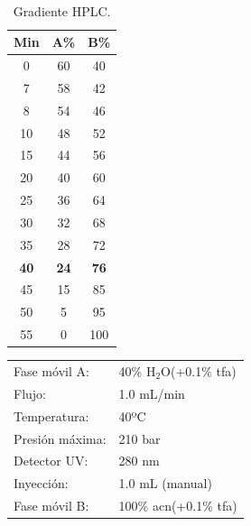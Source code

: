 \begin{table}
\vspace{-0.8cm} %
\centering
    \caption{\\Gradiente HPLC.}\label{tab:hplc_gradiente}
    \begin{tabular}[t]{ccc}%
     \toprule  %
      {Min}  & {A\%} & {B\%}\\
      \hline
        0       &  60    & 40  \\
        7       &  58    & 42 \\
        8       &  54    & 46  \\
        10      &  48    & 52 \\
        15      &  44    & 56  \\
        20      &  40    & 60 \\
        25      &  36    & 64  \\
        30      &  32    & 68 \\
        35      &  28    & 72  \\
    \textbf{40} & \textbf{24}    & \textbf{76} \\
        45      &  15    & 85  \\
        50      &  5     & 95 \\
        55      &  0     & 100  \\
      \bottomrule %
    \end{tabular}
    \vspace{-0.5cm} %
    \end{table} 

\begin{tabularx}{\textwidth}{@{}p{} p{}@{}}
Fase móvil A: & 40\% H$_{2}$O(+0.1\% \ac{tfa}) \\
Flujo:              & 1.0 mL/min        \\ 
Temperatura:        & 40ºC              \\
Presión máxima:     & 210 bar           \\
Detector UV:        & 280 nm            \\
Inyección:          & 1.0 mL (manual)     \\
Fase móvil B:   & 100\% \ac{acn}(+0.1\% \ac{tfa}) \\
\end{tabularx}


